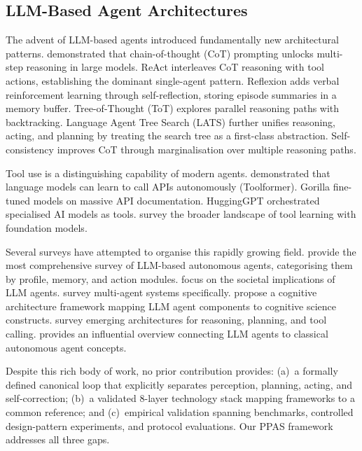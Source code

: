 \documentclass[review]{elsarticle}
\theoremstyle{definition}
\begin{document}
\subsection{LLM-Based Agent Architectures}

The advent of LLM-based agents introduced fundamentally new architectural patterns. \citet{wei2022chain} demonstrated that chain-of-thought (CoT) prompting unlocks multi-step reasoning in large models. ReAct \citep{yao2023react} interleaves CoT reasoning with tool actions, establishing the dominant single-agent pattern. Reflexion \citep{shinn2023reflexion} adds verbal reinforcement learning through self-reflection, storing episode summaries in a memory buffer. Tree-of-Thought (ToT) \citep{yao2024tree} explores parallel reasoning paths with backtracking. Language Agent Tree Search (LATS) \citep{zhou2024language} further unifies reasoning, acting, and planning by treating the search tree as a first-class abstraction. Self-consistency \citep{wang2023selfconsistency} improves CoT through marginalisation over multiple reasoning paths.

Tool use is a distinguishing capability of modern agents. \citet{schick2024toolformer} demonstrated that language models can learn to call APIs autonomously (Toolformer). Gorilla \citep{patil2023gorilla} fine-tuned models on massive API documentation. HuggingGPT \citep{shen2024hugginggpt} orchestrated specialised AI models as tools. \citet{qin2024toollearning} survey the broader landscape of tool learning with foundation models.

Several surveys have attempted to organise this rapidly growing field. \citet{wang2024survey} provide the most comprehensive survey of LLM-based autonomous agents, categorising them by profile, memory, and action modules. \citet{xi2023rise} focus on the societal implications of LLM agents. \citet{guo2024large} survey multi-agent systems specifically. \citet{sumers2024cognitive} propose a cognitive architecture framework mapping LLM agent components to cognitive science constructs. \citet{masterman2024landscape} survey emerging architectures for reasoning, planning, and tool calling. \citet{weng2023llmagents} provides an influential overview connecting LLM agents to classical autonomous agent concepts.

Despite this rich body of work, no prior contribution provides: (a)~a formally defined canonical loop that explicitly separates perception, planning, acting, and self-correction; (b)~a validated 8-layer technology stack mapping frameworks to a common reference; and (c)~empirical validation spanning benchmarks, controlled design-pattern experiments, and protocol evaluations. Our PPAS framework addresses all three gaps.
\end{document}
